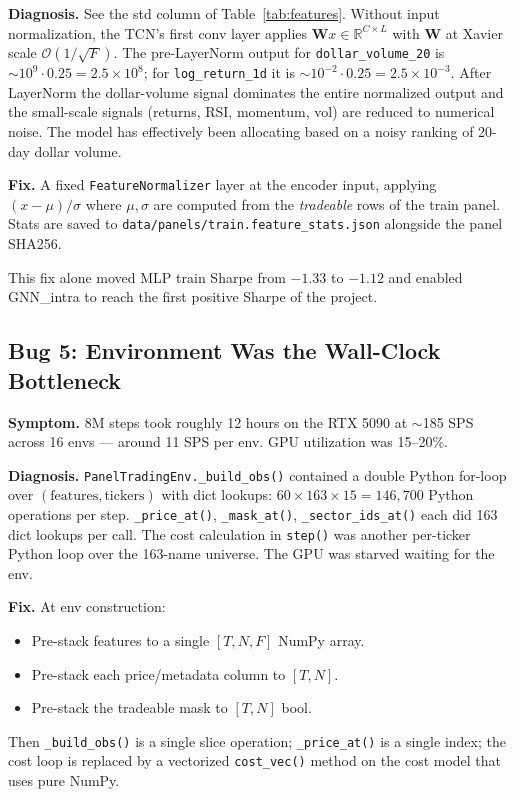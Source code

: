 \documentclass[11pt,a4paper]{article}
\begin{document}
\textbf{Diagnosis.} See the std column of Table~\ref{tab:features}. Without
input normalization, the TCN's first conv layer applies
$\mathbf{W} x \in \mathbb{R}^{C \times L}$ with $\mathbf{W}$ at Xavier scale
$\mathcal{O}(1/\sqrt{F})$. The pre-LayerNorm output for
\texttt{dollar\_volume\_20} is $\sim 10^9 \cdot 0.25 = 2.5 \times 10^8$; for
\texttt{log\_return\_1d} it is $\sim 10^{-2} \cdot 0.25 = 2.5 \times 10^{-3}$.
After LayerNorm the dollar-volume signal dominates the entire normalized output
and the small-scale signals (returns, RSI, momentum, vol) are reduced to numerical
noise. The model has effectively been allocating based on a noisy ranking of
20-day dollar volume.

\textbf{Fix.} A fixed \texttt{FeatureNormalizer} layer at the encoder input,
applying $(x - \mu) / \sigma$ where $\mu, \sigma$ are computed from the
\emph{tradeable} rows of the train panel. Stats are saved to
\texttt{data/panels/train.feature\_stats.json} alongside the panel SHA256.

This fix alone moved MLP train Sharpe from $-1.33$ to $-1.12$ and enabled
GNN\_intra to reach the first positive Sharpe of the project.

\subsection{Bug 5: Environment Was the Wall-Clock Bottleneck}

\textbf{Symptom.} 8M steps took roughly 12 hours on the RTX 5090 at $\sim$185
SPS across 16 envs --- around 11 SPS per env. GPU utilization was 15--20\%.

\textbf{Diagnosis.} \texttt{PanelTradingEnv.\_build\_obs()} contained a
double Python for-loop over $(\text{features}, \text{tickers})$ with dict
lookups: $60 \times 163 \times 15 = 146{,}700$ Python operations per step.
\texttt{\_price\_at()}, \texttt{\_mask\_at()}, \texttt{\_sector\_ids\_at()} each
did 163 dict lookups per call. The cost calculation in \texttt{step()} was
another per-ticker Python loop over the 163-name universe. The GPU was
starved waiting for the env.

\textbf{Fix.} At env construction:
\begin{itemize}
\item Pre-stack features to a single $[T, N, F]$ NumPy array.
\item Pre-stack each price/metadata column to $[T, N]$.
\item Pre-stack the tradeable mask to $[T, N]$ bool.
\end{itemize}
Then \texttt{\_build\_obs()} is a single slice operation; \texttt{\_price\_at()}
is a single index; the cost loop is replaced by a vectorized
\texttt{cost\_vec()} method on the cost model that uses pure NumPy.
\end{document}
